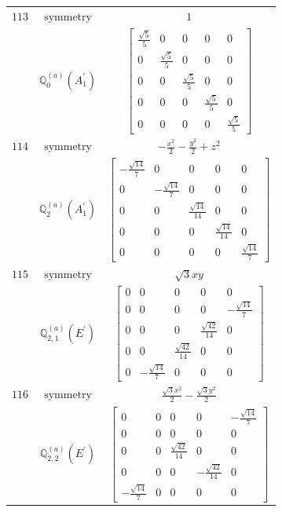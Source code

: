 \documentclass[fleqn,8pt,landscape]{jsarticle}
\begin{document}
\begin{longtable}{ccc}
$ 113 $ & $ \text{symmetry} $ & $ 1 $ \\
$  $ & $ \mathbb{Q}_{0}^{(a)}(A_{1}^{\prime}) $ & $ \begin{bmatrix} \frac{\sqrt{5}}{5} & 0 & 0 & 0 & 0 \\ 0 & \frac{\sqrt{5}}{5} & 0 & 0 & 0 \\ 0 & 0 & \frac{\sqrt{5}}{5} & 0 & 0 \\ 0 & 0 & 0 & \frac{\sqrt{5}}{5} & 0 \\ 0 & 0 & 0 & 0 & \frac{\sqrt{5}}{5} \end{bmatrix} $ \\ \hline
$ 114 $ & $ \text{symmetry} $ & $ - \frac{x^{2}}{2} - \frac{y^{2}}{2} + z^{2} $ \\
$  $ & $ \mathbb{Q}_{2}^{(a)}(A_{1}^{\prime}) $ & $ \begin{bmatrix} - \frac{\sqrt{14}}{7} & 0 & 0 & 0 & 0 \\ 0 & - \frac{\sqrt{14}}{7} & 0 & 0 & 0 \\ 0 & 0 & \frac{\sqrt{14}}{14} & 0 & 0 \\ 0 & 0 & 0 & \frac{\sqrt{14}}{14} & 0 \\ 0 & 0 & 0 & 0 & \frac{\sqrt{14}}{7} \end{bmatrix} $ \\ \hline
$ 115 $ & $ \text{symmetry} $ & $ \sqrt{3} x y $ \\
$  $ & $ \mathbb{Q}_{2,1}^{(a)}(E^{\prime}) $ & $ \begin{bmatrix} 0 & 0 & 0 & 0 & 0 \\ 0 & 0 & 0 & 0 & - \frac{\sqrt{14}}{7} \\ 0 & 0 & 0 & \frac{\sqrt{42}}{14} & 0 \\ 0 & 0 & \frac{\sqrt{42}}{14} & 0 & 0 \\ 0 & - \frac{\sqrt{14}}{7} & 0 & 0 & 0 \end{bmatrix} $ \\ \hline
$ 116 $ & $ \text{symmetry} $ & $ \frac{\sqrt{3} x^{2}}{2} - \frac{\sqrt{3} y^{2}}{2} $ \\
$  $ & $ \mathbb{Q}_{2,2}^{(a)}(E^{\prime}) $ & $ \begin{bmatrix} 0 & 0 & 0 & 0 & - \frac{\sqrt{14}}{7} \\ 0 & 0 & 0 & 0 & 0 \\ 0 & 0 & \frac{\sqrt{42}}{14} & 0 & 0 \\ 0 & 0 & 0 & - \frac{\sqrt{42}}{14} & 0 \\ - \frac{\sqrt{14}}{7} & 0 & 0 & 0 & 0 \end{bmatrix} $ \\ \hline

\end{longtable}
\end{document}

